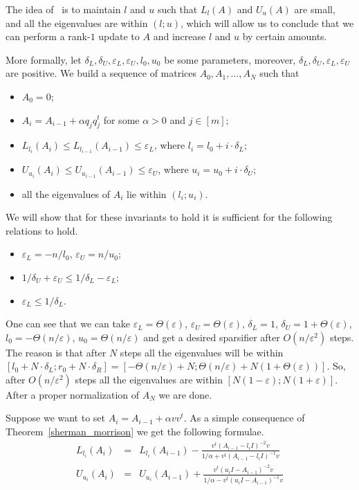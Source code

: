 \documentclass[12pt]{article}
\newcommand{\eps}{\varepsilon}
\begin{document}
    The idea of~\cite{BSS09} is to maintain $l$ and $u$ such that $L_l(A)$ and $U_u(A)$ are small, and all the eigenvalues are
    within $(l; u)$, which will allow us
    to conclude that we can perform a rank-$1$ update to $A$ and increase $l$ and $u$ by certain amounts.

    More formally, let $\delta_L, \delta_U, \eps_L, \eps_U, l_0, u_0$ be some parameters, moreover,
    $\delta_L, \delta_U, \eps_L, \eps_U$ are positive.
    We build a sequence of matrices $A_0, A_1, \ldots, A_N$ such that
    \begin{itemize}
        \item $A_0 = 0$;
        \item $A_i = A_{i-1} + \alpha q_j q_j^t$ for some $\alpha > 0$ and $j \in [m]$;
        \item $L_{l_i}(A_i) \leq L_{l_{i-1}}(A_{i-1}) \leq \eps_L$, where $l_i = l_0 + i \cdot \delta_L$;
        \item $U_{u_i}(A_i) \leq U_{u_{i-1}}(A_{i-1}) \leq \eps_U$, where $u_i = u_0 + i \cdot \delta_U$;
        \item all the eigenvalues of $A_i$ lie within $(l_i; u_i)$.
    \end{itemize}
    We will show that for these invariants to hold it is sufficient for the following relations to hold.
    \begin{itemize}
        \item $\eps_L = -n / l_0$, $\eps_U = n / u_0$;
        \item $1 / \delta_U + \eps_U \leq 1 / \delta_L - \eps_L$;
        \item $\eps_L \leq 1 / \delta_L$.
    \end{itemize}
    One can see that we can take $\eps_L = \Theta(\eps)$, $\eps_U = \Theta(\eps)$, $\delta_L = 1$,
    $\delta_U = 1 + \Theta(\eps)$, $l_0 = -\Theta(n / \eps)$, $u_0 = \Theta(n / \eps)$ and get a desired sparsifier
    after $O(n / \eps^2)$ steps. The reason is that after $N$ steps all the eigenvalues
    will be within $[l_0 + N \cdot \delta_L; r_0 + N \cdot \delta_R] =
    [-\Theta(n / \eps) + N; \Theta(n / \eps) + N (1 + \Theta(\eps))]$. So, after
    $O(n / \eps^2)$ steps all the eigenvalues are within $[N(1 - \eps); N(1 + \eps)]$.
    After a proper normalization of $A_N$ we are done.

    Suppose we want to set $A_i = A_{i-1} + \alpha vv^t$. As a simple consequence of Theorem~\ref{sherman_morrison} we
    get the following formulae.
    \begin{eqnarray*}
        L_{l_i}(A_i) &=& L_{l_i}(A_{i-1}) - \frac{v^t (A_{i-1} - l_iI)^{-2} v}{1 / \alpha + v^t (A_{i-1} - l_i I)^{-1} v}\\
        U_{u_i}(A_i) &=& U_{u_i}(A_{i-1}) + \frac{v^t (u_iI - A_{i-1})^{-2} v}{1 / \alpha - v^t (u_iI - A_{i-1})^{-1} v}\\
    \end{eqnarray*}
\end{document}
